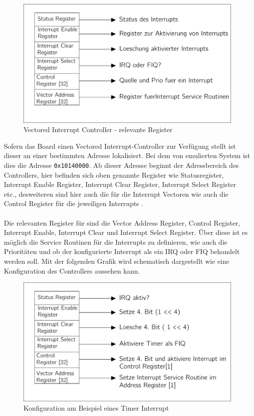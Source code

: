 \begin{figure}[H]
	\begin{center}	
	\caption{Vectored Interrupt Controller - relevante Register}
	\includegraphics[scale=0.60]{common/vic.pdf}
	\end{center}
	\label{vicSchema}
\end{figure}
\noindent
Sofern das Board einen Vectored Interrupt-Controller zur Verf\"ugung stellt ist dieser an einer bestimmten Adresse lokalisiert. Bei dem von \mops emulierten System ist dies die Adresse \texttt{0x10140000}\parencite[vgl.][223]{archManI}. Ab dieser Adresse beginnt der Adressbereich des Controllers, hier befinden sich oben genannte Register wie Statusregister, Interrupt Enable Register, Interrupt Clear Register, Interrupt Select Register etc., desweiteren sind hier auch die f\"ur die Interrupt Vectoren wie auch die Control Register f\"ur die jeweiligen Interrupts \parencite[vgl.][35]{vic}.\\\\
Die relevanten Register f\"ur \mops sind die Vector Address Register, Control Register, Interrupt Enable, Interrupt Clear und Interrupt Select Register. \"Uber diese ist es m\"oglich die Service Routinen f\"ur die Interrupts zu definieren, wie auch die Priorit\"aten und ob der konfigurierte Interrupt als ein IRQ oder FIQ behandelt werden soll. Mit der folgenden Grafik wird schematisch dargestellt wie eine Konfiguration des Controllers aussehen kann.
\begin{figure}[H]
	\begin{center}	
	\caption{Konfiguration am Beispiel eines Timer Interrupt}
	\includegraphics[scale=0.60]{common/vicsample.pdf}
	\end{center}
	\label{draft:vicSample}
\end{figure}
